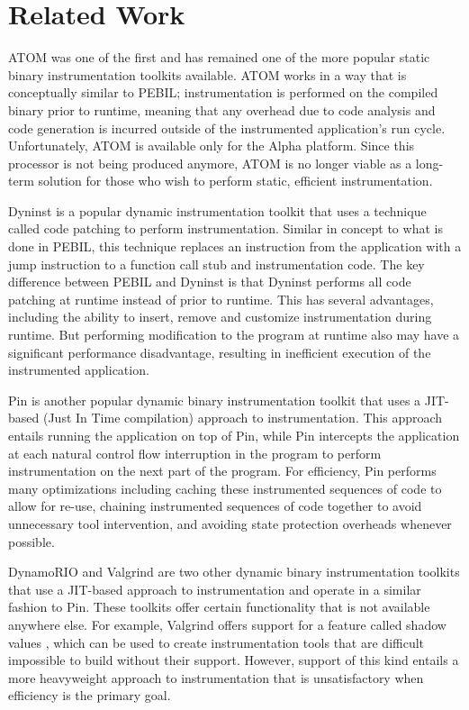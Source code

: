 \section{Related Work}
\label{sec:Related}

ATOM \cite{srivastava1994atom} was one of the first and has remained one of the
more popular static binary instrumentation toolkits available. ATOM works in a
way that is conceptually similar to PEBIL; instrumentation is performed on the
compiled binary prior to runtime, meaning that any overhead due to code analysis
and code generation is incurred outside of the instrumented application's run
cycle. Unfortunately, ATOM is available only for the Alpha platform. Since this
processor is not being produced anymore, ATOM is no longer viable as a long-term
solution for those who wish to perform static, efficient instrumentation. 

Dyninst \cite{buck2000api} is a popular dynamic instrumentation toolkit that
uses a technique called code patching to perform instrumentation. Similar in
concept to what is done in PEBIL, this technique replaces an instruction from
the application with a jump instruction to a function call stub and
instrumentation code. The key difference between PEBIL and Dyninst is that
Dyninst performs all code patching at runtime instead of prior to runtime. This
has several advantages, including the ability to insert, remove and customize
instrumentation during runtime. But performing modification to the program at
runtime also may have a significant performance disadvantage, resulting in
inefficient execution of the instrumented application.

Pin \cite{luk2005pin} is another popular dynamic binary instrumentation toolkit
that uses a JIT-based (Just In Time compilation) approach to instrumentation.
This approach entails running the application on top of Pin, while Pin
intercepts the application at each natural control flow interruption in the
program to perform instrumentation on the next part of the program. For
efficiency, Pin performs many optimizations including caching these instrumented
sequences of code to allow for re-use, chaining instrumented sequences of code
together to avoid unnecessary tool intervention, and avoiding state protection
overheads whenever possible.

DynamoRIO \cite{bruening2004efficient} and Valgrind
\cite{nethercote2007valgrind} are two other dynamic binary instrumentation
toolkits that use a JIT-based approach to instrumentation and operate in a
similar fashion to Pin. These toolkits offer certain functionality that is not
available anywhere else. For example, Valgrind offers support for a feature
called shadow values \cite{nethercote2007shadow}, which can be used to create
instrumentation tools that are difficult impossible to build without their
support. However, support of this kind entails a more heavyweight approach to
instrumentation that is unsatisfactory when efficiency is the primary goal.
